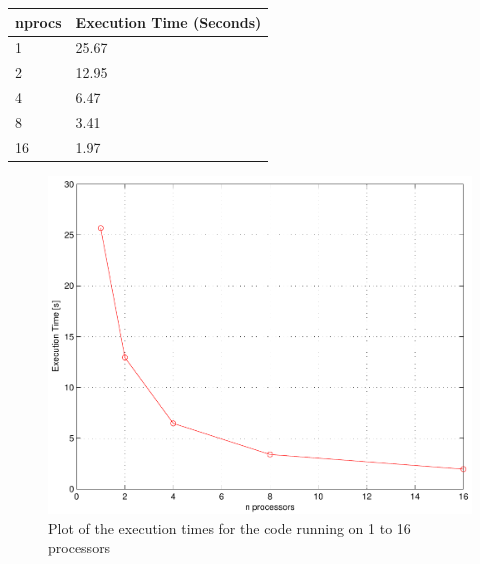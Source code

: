 \begin{table}
\center
    \begin{tabular}{|l|l|}
        \hline
        nprocs & Execution Time (Seconds) \\ \hline
        1      & 25.67                    \\ 
        2      & 12.95                    \\ 
        4      & 6.47                     \\ 
        8      & 3.41                     \\ 
        16     & 1.97                     \\
        \hline
    \end{tabular}
\end{table}

\begin{figure}[h!] 
 \center 
 \includegraphics[scale=0.7]{./figures/plot1.pdf}
 \caption{ Plot of the execution times for the code running on 1 to 16 processors \label{fig:plot}}
 \end{figure}

